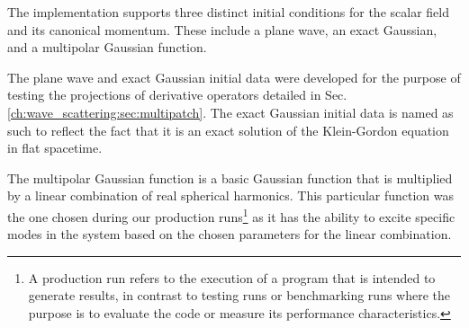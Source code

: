 The implementation supports three distinct initial conditions for the scalar field and its canonical momentum. These include a plane wave, an exact Gaussian, and a multipolar Gaussian function.

The plane wave and exact Gaussian initial data were developed for the purpose of testing the projections of derivative operators detailed in Sec.\ref{ch:wave_scattering:sec:multipatch}. The exact Gaussian initial data is named as such to reflect the fact that it is an exact solution of the Klein-Gordon equation in flat spacetime.

The multipolar Gaussian function is a basic Gaussian function that is multiplied by a linear combination of real spherical harmonics. This particular function was the one chosen during our production runs\footnote{A production run refers to the execution of a program that is intended to generate results, in contrast to testing runs or benchmarking runs where the purpose is to evaluate the code or measure its performance characteristics.} as it has the ability to excite specific modes in the system based on the chosen parameters for the linear combination.


